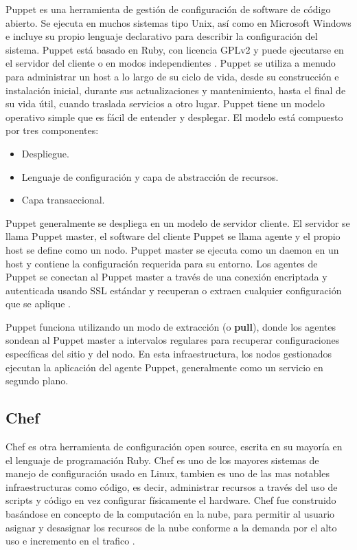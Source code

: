 \par Puppet es una herramienta de gestión de configuración de software de código abierto. Se ejecuta en muchos sistemas tipo Unix, así como en Microsoft Windows e incluye su propio lenguaje declarativo para describir la configuración del sistema. Puppet está basado en Ruby, con licencia GPLv2 y puede ejecutarse en el servidor del cliente o en modos independientes \cite{BOOK15}. Puppet se utiliza a menudo para administrar un host a lo largo de su ciclo de vida, desde su construcción e instalación inicial, durante sus actualizaciones y mantenimiento, hasta el final de su vida útil, cuando traslada servicios a otro lugar.
Puppet tiene un modelo operativo simple que es fácil de entender y desplegar. El modelo está compuesto por tres componentes: %
\begin{itemize}
    \item Despliegue.
    \item Lenguaje de configuración y capa de abstracción de recursos.
    \item Capa transaccional.
\end{itemize}

\par Puppet generalmente se despliega en un modelo de servidor cliente. %
El servidor se llama Puppet master, el software del cliente Puppet se llama agente y el propio host se define como un nodo. Puppet master se ejecuta como un daemon en un host y contiene la configuración requerida para su entorno. Los agentes de Puppet se conectan al Puppet master a través de una conexión encriptada y autenticada usando SSL estándar y recuperan o extraen cualquier configuración que se aplique \cite{BOOK15}.\\
 
\par Puppet funciona utilizando un modo de extracción (o \textbf{pull}), donde los agentes sondean al Puppet master a intervalos regulares para recuperar configuraciones específicas del sitio y del nodo. En esta infraestructura, los nodos gestionados ejecutan la aplicación del agente Puppet, generalmente como un servicio en segundo plano.\\


\subsection{Chef}
\par Chef es otra herramienta de configuración open source, escrita en su mayoría en el lenguaje de programación Ruby. Chef es uno de los mayores sistemas de manejo de configuración usado en Linux, tambien es uno de las mas notables infraestructuras como código, es decir, administrar recursos a través del uso de scripts y código en vez configurar físicamente el hardware. Chef fue construido basándose en concepto de la computación en la nube, para permitir al usuario asignar y desasignar los recursos de la nube conforme a la demanda por el alto uso e incremento en el trafico \cite{BOOK16}.\\
\vspace{\baselineskip}


